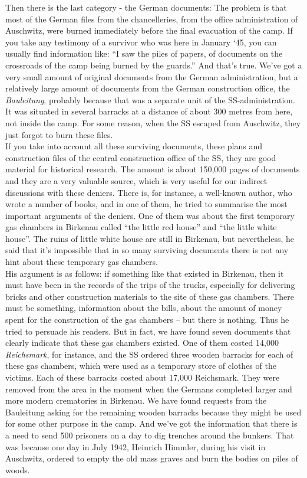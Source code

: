 Then there is the last category - the German documents: The problem is that most of the German files from the chancelleries, from the office administration of Auschwitz, were burned immediately before the final evacuation of the camp. If you take any testimony of a survivor who was here in January ‘45, you can usually find information like: ``I saw the piles of papers, of documents on the crossroads of the camp being burned by the guards.'' And that's true. We've got a very small amount of original documents from the German administration, but a relatively large amount of documents from the German construction office, the \textit{Bauleitung}, probably because that was a separate unit of the SS-administration. It was situated in several barracks at a distance of about 300 metres from here, not inside the camp. For some reason, when the SS escaped from Auschwitz, they just forgot to burn these files. \\
If you take into account all these surviving documents, these plans and construction files of the central construction office of the SS, they are good material for historical research. The amount is about 150,000 pages of documents and they are a very valuable source, which is very useful for our indirect discussions with these deniers. There is, for instance, a well-known author, who wrote a number of books, and in one of them, he tried to summarise the most important arguments of the deniers. One of them was about the first temporary gas chambers in Birkenau called ``the little red house'' and ``the little white house''. The ruins of little white house are still in Birkenau, but nevertheless, he said that it’s impossible that in so many surviving documents there is not any hint about these temporary gas chambers.\\ 
His argument is as follows: if something like that existed in Birkenau, then it must have been in the records of the trips of the trucks, especially for delivering bricks and other construction materials to the site of these gas chambers. There must be something, information about the bills, about the amount of money spent for the construction of the gas chambers – but there is nothing. Thus he tried to persuade his readers. But in fact, we have found seven documents that clearly indicate that these gas chambers existed. One of them costed 14,000 \textit{Reichsmark}, for instance, and the SS ordered three wooden barracks for each of these gas chambers, which were used as a temporary store of clothes of the victims. Each of these barracks costed about 17,000 Reichsmark. They were removed from the area in the moment when the Germans completed larger and more modern crematories in Birkenau. We have found requests from the Bauleitung asking for the remaining wooden barracks because they might be used for some other purpose in the camp. And we’ve got the information that there is a need to send 500 prisoners on a day to dig trenches around the bunkers. That was because one day in July 1942, Heinrich Himmler, during his visit in Auschwitz, ordered to empty the old mass graves and burn the bodies on piles of woods.\\ 

